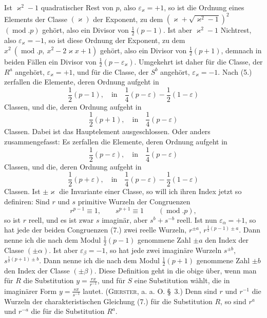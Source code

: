 \documentclass[11pt]{article}
\begin{document}
Ist $\varkappa^2-1$ quadratischer Rest von $p$, also $\varepsilon_\varkappa=+1$, so ist die Ordnung eines Elements der Classe $(\varkappa)$ der Exponent, zu dem $(\varkappa+\sqrt{\varkappa^2-1})^2$ $(\operatorname{mod}.p)$ gehört, also ein Divisor von $\frac12(p-1)$. Ist aber $\varkappa^2-1$ Nichtrest, also $\varepsilon_\varkappa=-1$, so ist diese Ordnung der Exponent, zu dem $x^2\ (\operatorname{mod}.p,\ x^2-2\varkappa x+1)$ gehört, also ein Divisor von $\frac12(p+1)$, demnach in beiden Fällen ein Divisor von $\frac12(p-\varepsilon_\varkappa)$. Umgekehrt ist daher für die Classe, der $R^a$ angehört, $\varepsilon_\varkappa=+1$, und für die Classe, der $S^b$ angehört, $\varepsilon_\varkappa=-1$. Nach (5.) zerfallen die Elemente, deren Ordnung aufgeht in
\begin{equation*}\tag{11.}
\frac12(p-1),\quad \text{in}\quad \frac14(p-\varepsilon)-\frac12(1-\varepsilon)
\end{equation*}
Classen, und die, deren Ordnung aufgeht in
\begin{equation*}\tag{12.}
\frac12(p+1),\quad \text{in}\quad \frac14(p-\varepsilon)
\end{equation*}
Classen. Dabei ist das Hauptelement ausgeschlossen. Oder anders zusammengefasst: Es zerfallen die Elemente, deren Ordnung aufgeht in
\begin{equation*}\tag{13.}
\frac12(p-\varepsilon),\quad \text{in}\quad \frac14(p-\varepsilon)
\end{equation*}
Classen, und die, deren Ordnung aufgeht in
\begin{equation*}\tag{14.}
\frac12(p+\varepsilon),\quad \text{in}\quad \frac14(p-\varepsilon)-\frac12(1-\varepsilon)
\end{equation*}
Classen. Ist $\pm\varkappa$ die Invariante einer Classe, so will ich ihren Index jetzt so definiren: Sind $r$ und $s$ primitive Wurzeln der Congruenzen
\begin{equation*}\tag{15.}
r^{p-1}\equiv1,\qquad s^{p+1}\equiv1\qquad(\operatorname{mod}.p),
\end{equation*}
so ist $r$ reell, und es ist zwar $s$ imaginär, aber $s^b+s^{-b}$ reell. Ist nun $\varepsilon_\alpha=+1$, so hat jede der beiden Congruenzen (7.) zwei reelle Wurzeln, $r^{\pm a}$, $r^{\frac12(p-1)\pm a}$. Dann nenne ich die nach dem Modul $\frac12(p-1)$ genommene Zahl $\pm a$ den Index der Classe $(\pm\alpha)$. Ist aber $\varepsilon_\beta=-1$, so hat jede zwei imaginäre Wurzeln $s^{\pm b}$, $s^{\frac12(p+1)\pm b}$. Dann nenne ich die nach dem Modul $\frac12(p+1)$ genommene Zahl $\pm b$ den Index der Classe $(\pm\beta)$. Diese Definition geht in die obige über, wenn man für $R$ die Substitution $y=\frac{rx}{r^{-1}}$, und für $S$ eine Substitution wählt, die in imaginärer Form $y=\frac{sx}{s^{-1}}$ lautet. (\textsc{Gierster}, a. a. O. \S~3.) Denn sind $r$ und $r^{-1}$ die Wurzeln der charakteristischen Gleichung (7.) für die Substitution $R$, so sind $r^a$ und $r^{-a}$ die für die Substitution $R^a$.
\end{document}
